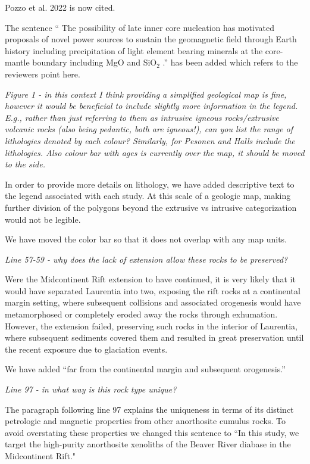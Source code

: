 \documentclass[11pt, letterpaper]{article}
\begin{document}
\begin{flushleft}
Pozzo et al. 2022 is now cited.

The sentence `` The possibility of late inner core nucleation has motivated proposals of novel power sources to sustain the geomagnetic field through Earth history including precipitation of light element bearing minerals at the core-mantle boundary including MgO \cite{Badro2016a, ORourke2016b} and SiO$_2$ \cite{Mittal2020a}.'' has been added which refers to the reviewers point here.

\textit{Figure 1 - in this context I think providing a simplified geological map is fine, however it would be beneficial to include slightly more information in the legend. E.g., rather than just referring to them as intrusive igneous rocks/extrusive volcanic rocks (also being pedantic, both are igneous!), can you list the range of lithologies denoted by each colour? Similarly, for Pesonen and Halls include the lithologies. Also colour bar with ages is currently over the map, it should be moved to the side.}

In order to provide more details on lithology, we have added descriptive text to the legend associated with each study. At this scale of a geologic map, making further division of the polygons beyond the extrusive vs intrusive categorization would not be legible.

We have moved the color bar so that it does not overlap with any map units.

\textit{Line 57-59 - why does the lack of extension allow these rocks to be preserved?}

Were the Midcontinent Rift extension to have continued, it is very likely that it would have separated Laurentia into two, exposing the rift rocks at a continental margin setting, where subsequent collisions and associated orogenesis would have metamorphosed or completely eroded away the rocks through exhumation. However, the extension failed, preserving such rocks in the interior of Laurentia, where subsequent sediments covered them and resulted in great preservation until the recent exposure due to glaciation events.

We have added ``far from the continental margin and subsequent orogenesis.''

\textit{Line 97 - in what way is this rock type unique?}

The paragraph following line 97 explains the uniqueness in terms of its distinct petrologic and magnetic properties from other anorthosite cumulus rocks. To avoid overstating these properties we changed this sentence to ``In this study, we target the high-purity anorthosite xenoliths of the Beaver River diabase in the Midcontinent Rift."


\end{flushleft}
\end{document}
